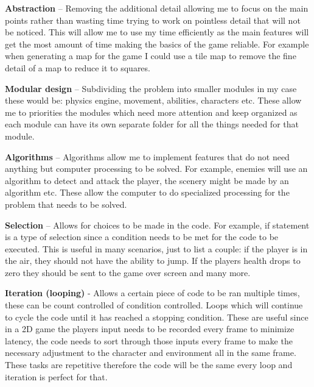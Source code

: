 \documentclass{article}
\newcommand{\parBr}{\vspace{5mm}}%
\begin{document}
\parBr

\textbf{Abstraction} – Removing the additional detail allowing me to focus on the main points rather than wasting time trying to work on pointless detail that will not be noticed. This will allow me to use my time efficiently as the main features will get the most amount of time making the basics of the game reliable. For example when generating a map for the game I could use a tile map to remove the fine detail of a map to reduce it to squares.

\parBr

\textbf{Modular design} – Subdividing the problem into smaller modules in my case these would be: physics engine, movement, abilities, characters etc. These allow me to priorities the modules which need more attention and keep organized as each module can have its own separate folder for all the things needed for that module.

\parBr

\textbf{Algorithms} – Algorithms allow me to implement features that do not need anything but computer processing to be solved. For example, enemies will use an algorithm to detect and attack the player, the scenery might be made by an algorithm etc. These allow the computer to do specialized processing for the problem that needs to be solved.

\parBr

\textbf{Selection} – Allows for choices to be made in the code. For example, if statement is a type of selection since a condition needs to be met for the code to be executed. This is useful in many scenarios, just to list a couple: if the player is in the air, they should not have the ability to jump. If the players health drops to zero they should be sent to the game over screen and many more.

\parBr

\textbf{Iteration (looping)} - Allows a certain piece of code to be ran multiple times, these can be count controlled of condition controlled. Loops which will continue to cycle the code until it has reached a stopping condition. These are useful since in a 2D game the players input needs to be recorded every frame to minimize latency, the code needs to sort through those inputs every frame to make the necessary adjustment to the character and environment all in the same frame. These tasks are repetitive therefore the code will be the same every loop and iteration is perfect for that.

\parBr
\end{document}
